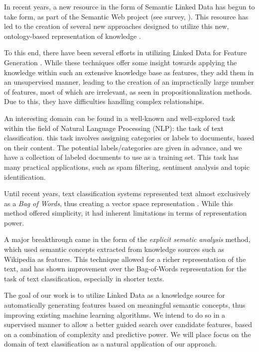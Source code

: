 \documentclass[12pt, a4paper]{article}
\theoremstyle{definition}
\begin{document}
In recent years, a new resource in the form of Semantic Linked Data has begun to take form, as part of the Semantic Web project (see survey, \citet{bizer2009linked}). This resource has led to the creation of several new approaches designed to utilize this new, ontology-based representation of knowledge \citep{losch2012graph,rios2014statistical}.

To this end, there have been several efforts in utilizing Linked Data for Feature Generation \citep{cheng2011automated, paulheim2012unsupervised}. While these techniques offer some insight towards applying the knowledge within such an extensive knowledge base as features, they add them in an unsupervised manner, leading to the creation of an impractically large number of features, most of which are irrelevant, as seen in propositionalization methods. Due to this, they have difficulties handling complex relationships.


An interesting domain can be found in a well-known and well-explored task within the field of Natural Language Processing (NLP): the task of text classification.
this task involves assigning categories or labels to documents, based on their content. The potential labels/categories are given in advance, and we have a collection of labeled documents to use as a training set. This task has many practical applications, such as spam filtering, sentiment analysis and topic identification.

Until recent years, text classification systems represented text almost exclusively as a \emph{Bag of Words}, thus creating a vector space representation \citep{Wu:1981:CST:1013228.511759, salton1983introduction}. While this method offered simplicity, it had inherent limitations in terms of representation power.

A major breakthrough came in the form of the \emph{explicit sematic analysis} \citep{gabrilovich2006overcoming} method, which used semantic concepts extracted from knowledge sources such as Wikipedia as features. This technique allowed for a richer representation of the text, and has shown improvement over the Bag-of-Words representation for the task of text classification, especially in shorter texts.

The goal of our work is to utilize Linked Data as a knowledge source for automatically generating features based on meaningful semantic concepts, thus improving existing machine learning algorithms. We intend to do so in a supervised manner to allow a better guided search over candidate features, based on a combination of complexity and predictive power. We will place focus on the domain of text classification as a natural application of our approach.
\end{document}
